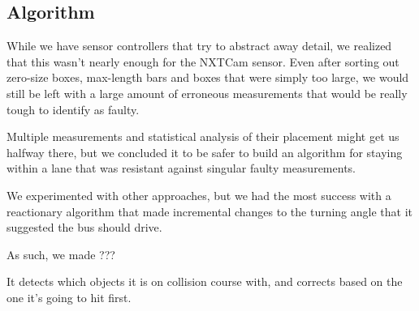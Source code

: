 \subsection{Algorithm}

While we have sensor controllers that try to abstract away detail, we realized that this wasn't nearly enough for the NXTCam sensor. Even after sorting out zero-size boxes, max-length bars and boxes that were simply too large, we would still be left with a large amount of erroneous measurements that would be really tough to identify as faulty.

Multiple measurements and statistical analysis of their placement might get us halfway there, but we concluded it to be safer to build an algorithm for staying within a lane that was resistant against singular faulty measurements.

We experimented with other approaches, but we had the most success with a reactionary algorithm that made incremental changes to the turning angle that it suggested the bus should drive. 

As such, we made ???


It detects which objects it is on collision course with, and corrects based on the one it's going to hit first. 








